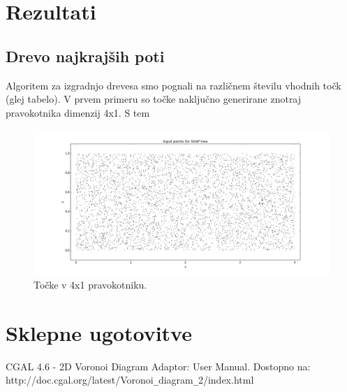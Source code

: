 \documentclass[a4paper, 12pt]{book}
\begin{document}




\chapter{Rezultati}
\label{ch3}
\section{Drevo najkrajših poti}
Algoritem za izgradnjo drevesa smo pognali na različnem številu vhodnih točk (glej tabelo). V prvem primeru so točke naključno generirane znotraj pravokotnika dimenzij 4x1. S tem 
\begin{figure}
\centerline{\includegraphics[scale=0.3]{pics/w_points5000-1.png}}
\caption{Točke v 4x1 pravokotniku.}
\label{adsr}
\end{figure}


\chapter{Sklepne ugotovitve}
\label{ch4}

\begin{thebibliography}{99}
CGAL 4.6 - 2D Voronoi Diagram Adaptor: User Manual. Dostopno na:\\ http://doc.cgal.org/latest/Voronoi\texttt{\_}diagram\texttt{\_}2/index.html

\end{thebibliography}
\end{document}
